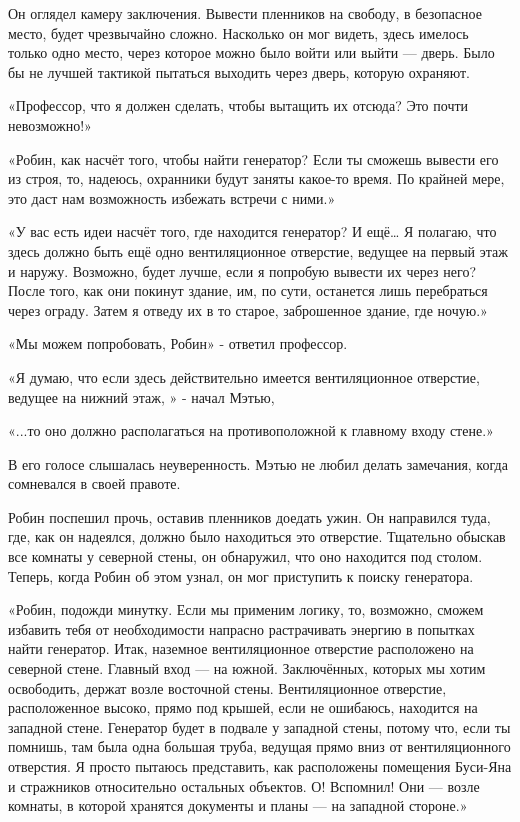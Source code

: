 \documentclass[a5paper, 9pt,
final, openany, twoside=true]{memoir}
\begin{document}
Он оглядел камеру заключения. Вывести пленников на свободу, в безопасное место, будет чрезвычайно сложно. Насколько он мог видеть, здесь имелось только одно место, через которое можно было войти или выйти — дверь. Было бы не лучшей тактикой пытаться выходить через дверь, которую охраняют.

«Профессор, что я должен сделать, чтобы вытащить их отсюда? Это почти невозможно!»

«Робин, как насчёт того, чтобы найти генератор? Если ты сможешь вывести его из строя, то, надеюсь, охранники будут заняты какое-то время. По крайней мере, это даст нам возможность избежать встречи с ними.»

«У вас есть идеи насчёт того, где находится генератор? И ещё… Я полагаю, что здесь должно быть ещё одно вентиляционное отверстие, ведущее на первый этаж и наружу. Возможно, будет лучше, если я попробую вывести их через него? После того, как они покинут здание, им, по сути, останется лишь перебраться через ограду. Затем я отведу их в то старое, заброшенное здание, где ночую.»

«Мы можем попробовать, Робин» - ответил профессор.

«Я думаю, что если здесь действительно имеется вентиляционное отверстие, ведущее на нижний этаж, » - начал Мэтью,

«...то оно должно располагаться на противоположной к главному входу стене.»

В его голосе слышалась неуверенность. Мэтью не любил делать замечания, когда сомневался в своей правоте.

Робин поспешил прочь, оставив пленников доедать ужин. Он направился туда, где, как он надеялся, должно было находиться это отверстие. Тщательно обыскав все комнаты у северной стены, он обнаружил, что оно находится под столом. Теперь, когда Робин об этом узнал, он мог приступить к поиску генератора.

«Робин, подожди минутку. Если мы применим логику, то, возможно, сможем избавить тебя от необходимости напрасно растрачивать энергию в попытках найти генератор. Итак, наземное вентиляционное отверстие расположено на северной стене. Главный вход — на южной. Заключённых, которых мы хотим освободить, держат возле восточной стены. Вентиляционное отверстие, расположенное высоко, прямо под крышей, если не ошибаюсь, находится на западной стене. Генератор будет в подвале у западной стены, потому что, если ты помнишь, там была одна большая труба, ведущая прямо вниз от вентиляционного отверстия. Я просто пытаюсь представить, как расположены помещения Буси-Яна и стражников относительно остальных объектов. О! Вспомнил! Они — возле комнаты, в которой хранятся документы и планы — на западной стороне.»
\end{document}
